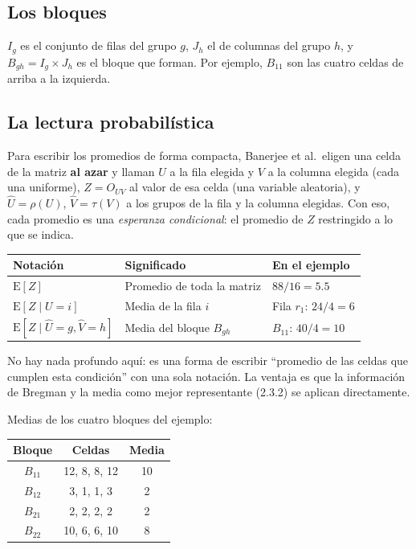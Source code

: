 \documentclass[11pt,a4paper]{article}
\begin{document}
\subsection{Los bloques}

$I_g$ es el conjunto de filas del grupo $g$, $J_h$ el de columnas del grupo $h$, y
$B_{gh}=I_g\times J_h$ es el bloque que forman. Por ejemplo, $B_{11}$ son las
cuatro celdas de arriba a la izquierda.

\subsection{La lectura probabilística}

Para escribir los promedios de forma compacta, Banerjee et al.\ eligen una celda
de la matriz \textbf{al azar} y llaman $U$ a la fila elegida y $V$ a la columna
elegida (cada una uniforme), $Z=O_{UV}$ al valor de esa celda (una variable
aleatoria), y $\hat U=\rho(U)$, $\hat V=\tau(V)$ a los grupos de la fila y la
columna elegidas. Con eso, cada promedio es una \emph{esperanza condicional}: el
promedio de $Z$ restringido a lo que se indica.

\begin{center}
\renewcommand{\arraystretch}{1.3}
\begin{tabular}{@{}>{\raggedright\arraybackslash}p{4.4cm}>{\raggedright\arraybackslash}p{5.6cm}>{\raggedright\arraybackslash}p{3.4cm}@{}}
\toprule
\textbf{Notación} & \textbf{Significado} & \textbf{En el ejemplo} \\
\midrule
$\mathrm{E}[Z]$ & Promedio de toda la matriz & $88/16=5.5$ \\
\midrule
$\mathrm{E}[Z\mid U=i]$ & Media de la fila $i$ & Fila $r_1$: $24/4=6$ \\
\midrule
$\mathrm{E}[Z\mid\hat U=g,\hat V=h]$ & Media del bloque $B_{gh}$ & $B_{11}$: $40/4=10$ \\
\bottomrule
\end{tabular}
\end{center}
No hay nada profundo aquí: es una forma de escribir ``promedio de las celdas que
cumplen esta condición'' con una sola notación. La ventaja es que la información de
Bregman y la media como mejor representante (2.3.2) se aplican directamente.

Medias de los cuatro bloques del ejemplo:
\begin{center}
\begin{tabular}{ccc}
\toprule
Bloque & Celdas & Media \\
\midrule
$B_{11}$ & 12, 8, 8, 12 & 10 \\
$B_{12}$ & 3, 1, 1, 3 & 2 \\
$B_{21}$ & 2, 2, 2, 2 & 2 \\
$B_{22}$ & 10, 6, 6, 10 & 8 \\
\bottomrule
\end{tabular}
\end{center}
\end{document}
